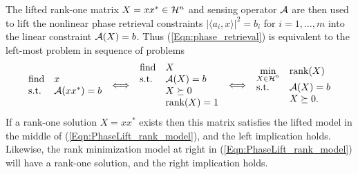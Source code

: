 The lifted rank-one matrix $X = xx^* \in {\mathcal H}^n$ and sensing operator ${\mathcal A}$ are then used to lift the nonlinear phase retrieval constraints $| \langle a_i, x \rangle | ^2 = b_i$ for $i = 1, \ldots, m$ into the linear constraint ${\mathcal A}(X) = b$.  Thus (\ref{Eqn:phase_retrieval}) is equivalent to the left-most problem in sequence of problems
\begin{equation} 		\label{Eqn:PhaseLift_rank_model}
\begin{array}{ll}
		\textnormal{find}
		&	x
			\\
		\textnormal{s.t.}
		& 	{\mathcal A} (xx^*) = b
\end{array}
\iff
\begin{array}{ll}
		\textnormal{find}
		&	X
			\\
		\textnormal{s.t.}
		& 	{\mathcal A} (X) = b
			\\
		&	X \succeq 0
			\\
		&	\textnormal{rank}(X) = 1
\end{array}
\iff
\begin{array}{ll}
		\min\limits_{\substack{X \in {\mathcal H}^n}}
		&	\textnormal{rank}(X)
			\\
		\textnormal{s.t.}
		& 	{\mathcal A} (X) = b
			\\
		&	X \succeq 0.
\end{array}
\end{equation}
If a rank-one solution  $X = xx^*$ exists then this matrix satisfies the lifted model in the middle of (\ref{Eqn:PhaseLift_rank_model}), and the left implication holds.  Likewise, the rank minimization model at right in (\ref{Eqn:PhaseLift_rank_model}) will have a rank-one solution, and the right implication holds.  






